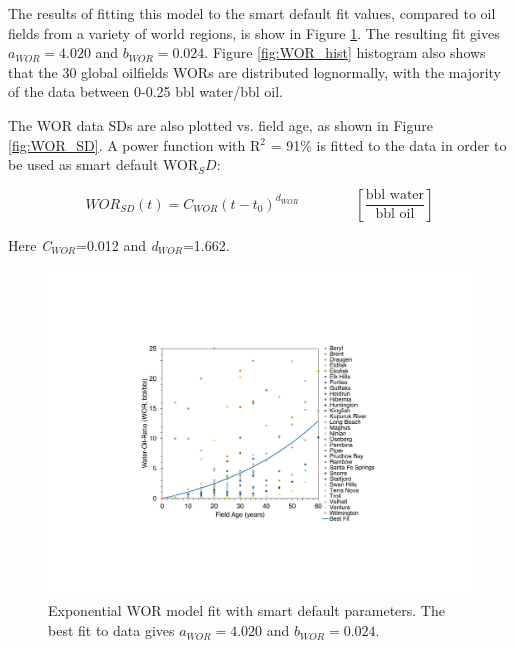\documentclass[11pt]{report}
\newcommand{\eqnunitfrac}[2]{\quad\quad \scriptstyle{\left[\frac{\text{#1}}{\text{#2}}\right]}}
\begin{document}
The results of fitting this model to the smart default fit values, compared to oil fields from a variety of world regions, is show in Figure \ref{fig:exponenital_fit_WOR}. The resulting fit gives $a_{WOR} = 4.020$ and $b_{WOR} = 0.024$. Figure \ref{fig:WOR_hist} histogram also shows that the 30 global oilfields WORs are distributed lognormally, with the majority of the data between 0-0.25 bbl water/bbl oil. 

The WOR data SDs are also plotted vs. field age, as shown in Figure \ref{fig:WOR_SD}. A power function with R$^2$ = 91\% is fitted to the data in order to be used as smart default WOR$_SD$:

\begin{equation}\label{eq:smart_default_WOR_STDV}
WOR_{SD}(t) = C_{WOR}( t - t_0 )^{d_{WOR}} \quad\quad\eqnunitfrac{bbl water}{bbl oil}
\end{equation}

Here \emph{C$_{WOR}$}=0.012 and \emph{d$_{WOR}$}=1.662. 

\begin{figure}
\includegraphics[width=1\columnwidth]{images/WOR_plot.pdf}
\caption{Exponential WOR model fit with smart default parameters. The best fit to data gives $a_{WOR} = 4.020$ and $b_{WOR} = 0.024$.}
\label{fig:exponenital_fit_WOR}
\end{figure}
\end{document}
